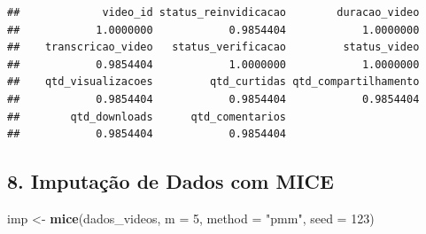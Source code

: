 \documentclass[
]{article}
\newenvironment{Shaded}{\begin{snugshade}}{\end{snugshade}}
\newcommand{\AttributeTok}[1]{\textcolor[rgb]{0.13,0.29,0.53}{#1}}
\newcommand{\DecValTok}[1]{\textcolor[rgb]{0.00,0.00,0.81}{#1}}
\newcommand{\FunctionTok}[1]{\textcolor[rgb]{0.13,0.29,0.53}{\textbf{#1}}}
\newcommand{\NormalTok}[1]{#1}
\newcommand{\OtherTok}[1]{\textcolor[rgb]{0.56,0.35,0.01}{#1}}
\newcommand{\StringTok}[1]{\textcolor[rgb]{0.31,0.60,0.02}{#1}}
\begin{document}
\begin{verbatim}
##             video_id status_reinvidicacao        duracao_video 
##            1.0000000            0.9854404            1.0000000 
##    transcricao_video   status_verificacao         status_video 
##            0.9854404            1.0000000            1.0000000 
##    qtd_visualizacoes         qtd_curtidas qtd_compartilhamento 
##            0.9854404            0.9854404            0.9854404 
##        qtd_downloads      qtd_comentarios 
##            0.9854404            0.9854404
\end{verbatim}

\subsection{8. Imputação de Dados com
MICE}\label{imputauxe7uxe3o-de-dados-com-mice}

\begin{Shaded}
\begin{Highlighting}[]
\NormalTok{imp }\OtherTok{\textless{}{-}} \FunctionTok{mice}\NormalTok{(dados\_videos, }\AttributeTok{m =} \DecValTok{5}\NormalTok{, }\AttributeTok{method =} \StringTok{"pmm"}\NormalTok{, }\AttributeTok{seed =} \DecValTok{123}\NormalTok{)}
\end{Highlighting}
\end{Shaded}
\end{document}
